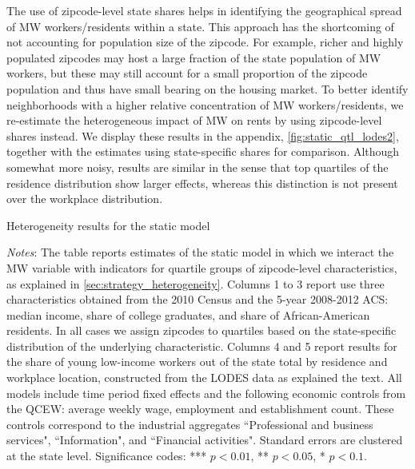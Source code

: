 The use of zipcode-level state shares helps in identifying the geographical spread of MW 
workers/residents within a state. This approach has the shortcoming of not accounting for 
population size of the zipcode. For example, richer and highly populated zipcodes may host a large 
fraction of the state population of MW workers, but these may still account for a small proportion 
of the zipcode population and thus have small bearing on the housing market. To better identify 
neighborhoods with a higher relative concentration of MW workers/residents, we re-estimate the 
heterogeneous impact of MW on rents by using zipcode-level shares instead. We display these results 
in the appendix, \autoref{fig:static_qtl_lodes2}, together with the estimates using state-specific 
shares for comparison. Although somewhat more noisy, results are similar in the sense that top 
quartiles of the residence distribution show larger effects, whereas this distinction is not 
present over the workplace distribution.

\begin{table}[h!]
    \caption{Heterogeneity results for the static model}
    \label{tab:fd_model_het}
    \centering
    \resizebox{0.95\textwidth}{!}{             
	    \vspace{0pt}    
	    
    }
    \begin{minipage}{0.95\textwidth} \footnotesize
		\vspace{3mm}
		\textit{Notes}: The table reports estimates of the static model in which we interact the 
		MW variable with indicators for quartile groups of zipcode-level characteristics, as explained
		in \autoref{sec:strategy_heterogeneity}. Columns 1 to 3 report use three characteristics 
		obtained from the 2010 Census and the 5-year 2008-2012 ACS: median income, share of college
		graduates, and share of African-American residents. In all cases we assign zipcodes to quartiles 
		based on the state-specific distribution of the underlying characteristic. Columns 4 and 5 
		report results for the share of young low-income workers out of the state total by residence
		and workplace location, constructed from the LODES data as explained the text. All models
		include time period fixed effects and the following economic controls from the QCEW: average
		weekly wage, employment and establishment count. These controls correspond to the industrial 
		aggregates ``Professional and business services", ``Information", and ``Financial activities".
		Standard errors are clustered at the state level. Significance codes: *** $p < 0.01$, ** 
		$p < 0.05$, * $p < 0.1$.
	\end{minipage}
\end{table}
